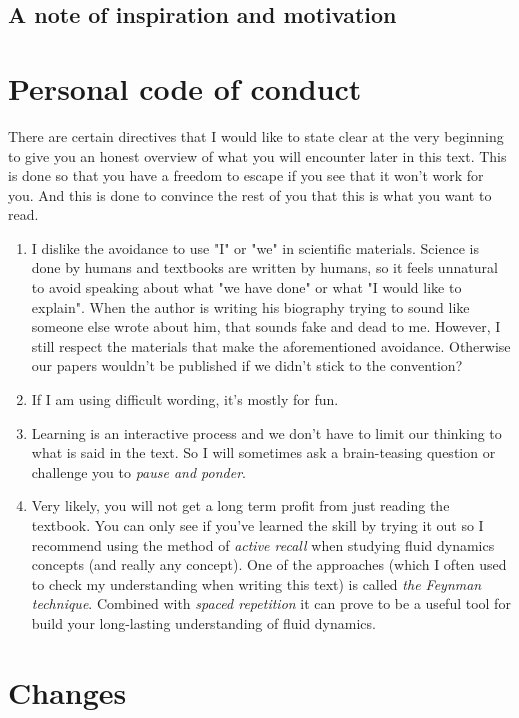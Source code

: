 \documentclass[10pt]{report}
\begin{document}
\section*{A note of inspiration and motivation}

\newpage

\chapter*{Personal code of conduct}

There are certain directives that I would like to state clear at the very beginning to give you an honest overview of what you will encounter later in this text. This is done so that you have a freedom to escape if you see that it won't work for you. And this is done to convince the rest of you that this is what you want to read.

\begin{enumerate}
\item I dislike the avoidance to use "I" or "we" in scientific materials. Science is done by humans and textbooks are written by humans, so it feels unnatural to avoid speaking about what "we have done" or what "I would like to explain". When the author is writing his biography trying to sound like someone else wrote about him, that sounds fake and dead to me. However, I still respect the materials that make the aforementioned avoidance. Otherwise our papers wouldn't be published if we didn't stick to the convention?
\item If I am using difficult wording, it's mostly for fun.
\item Learning is an interactive process and we don't have to limit our thinking to what is said in the text. So I will sometimes ask a brain-teasing question or challenge you to \textit{pause and ponder}.
\item Very likely, you will not get a long term profit from just reading the textbook. You can only see if you've learned the skill by trying it out so I recommend using the method of \textit{active recall} when studying fluid dynamics concepts (and really any concept). One of the approaches (which I often used to check my understanding when writing this text) is called \textit{the Feynman technique}. Combined with \textit{spaced repetition} it can prove to be a useful tool for build your long-lasting understanding of fluid dynamics.
\end{enumerate}

\chapter{Changes}
\end{document}
